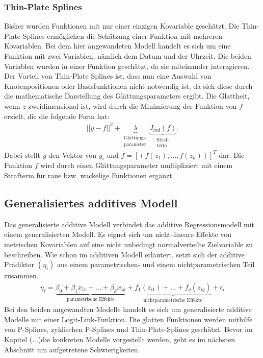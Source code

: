 \subsubsection{Thin-Plate Splines}
Bisher wurden Funktionen mit nur einer einzigen Kovariable geschätzt. Die Thin-Plate Splines ermöglichen die Schätzung einer Funktion mit mehreren Kovariablen. Bei dem hier angewandeten Modell handelt es sich um eine Funktion mit zwei Variablen, nämlich dem Datum und der Uhrzeit. Die beiden Variablen wurden in einer Funktion geschätzt, da sie miteinander interagieren. Der Vorteil von Thin-Plate Splines ist, dass nun eine Auswahl von Knotenpositionen oder Basisfunktionen nicht notwendig ist, da sich diese durch die mathematische Darstellung des Glättungsparameters ergibt. Die Glattheit, wenn $z$ zweidimensional ist, wird durch die Minimierung der Funktion von $f$ erzielt, die die folgende Form hat:
\begin{align}
||y-f||^2+\underbrace{\lambda}_{\substack{\text{Glättungs-} \\ \text{parameter}}} \underbrace{J_{md}(f)}_{\substack{\text{Straf-} \\ \text{term}}}.
\end{align}
Dabei stellt $y$ den Vektor von $y_{i}$ und $f=[(f(z_{1}),...,f(z_{n}))]^T$ dar. Die Funktion $f$ wird durch einen Glättungsparameter multipliziert mit einem Strafterm für raue bzw. wackelige Funktionen ergänzt.

\subsection{Generalisiertes additives Modell}
Das generalisierte additive Modell verbindet das additive Regressionsmodell mit einem generalisierten Modell.
Es eignet sich um nicht-lineare Effekte von metrischen Kovariablen auf eine nicht unbedingt normalverteilte Zielvariable zu beschreiben. Wie schon im additiven Modell erläutert, setzt sich der additive Prädiktor $(\eta_{i})$ aus einem parametrischen- und einem nichtparametrischen Teil zusammen.
\begin{align}
\eta_{i}=\underbrace{\beta_{0}+\beta_{1}x_{i1}+...+\beta_{k}x_{ik}}_{\text{parametrische Effekte}}+ \underbrace{f_{1}(z_{i1})+...+f_{q}(z_{iq})}_{\text{nichtparametrische Effekte}}+\epsilon_{i}
\end{align}
Bei den beiden angewandten Modelle handelt es sich um generalisierte additive Modelle mit einer Logit-Link-Funktion. Die glatten Funktionen werden mithilfe von P-Splines, zyklischen P-Splines und Thin-Plate-Splines geschätzt. Bevor im Kapitel (...)die konkreten Modelle vorgestellt werden, geht es im nächsten Abschnitt um aufgetretene Schwierigkeiten.

